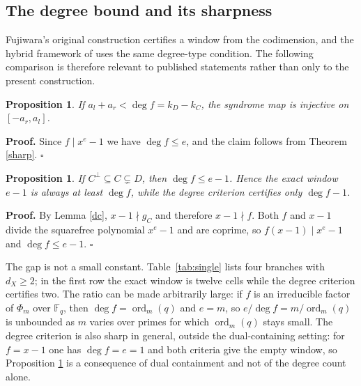 \documentclass[11pt,reqno]{amsart}
\newtheorem{proposition}[theorem]{Proposition}
\theoremstyle{definition}
\theoremstyle{remark}
\newcommand{\F}{\mathbb{F}}
\newcommand{\ord}{\operatorname{ord}}
\begin{document}
\subsection{The degree bound and its sharpness}

Fujiwara's original construction certifies a window from the codimension, and the hybrid framework of \cite{TansuwannontNemec2026} uses the same degree-type condition. The following comparison is therefore relevant to published statements rather than only to the present construction.


\begin{proposition}\label{degree}
If $a_l+a_r<\deg f=k_D-k_C$, the syndrome map is injective on $[-a_r,a_l]$.
\end{proposition}

\textbf{Proof.} Since $f\mid x^e-1$ we have $\deg f\le e$, and the claim follows from Theorem \ref{sharp}. $\square$


\begin{proposition}\label{gap}
If $C^\perp\subseteq C\subsetneq D$, then $\deg f\le e-1$. Hence the exact window $e-1$ is always at least $\deg f$, while the degree criterion certifies only $\deg f-1$.
\end{proposition}

\textbf{Proof.} By Lemma \ref{dc}, $x-1\nmid g_C$ and therefore $x-1\nmid f$. Both $f$ and $x-1$ divide the squarefree polynomial $x^e-1$ and are coprime, so $f(x-1)\mid x^e-1$ and $\deg f\le e-1$. $\square$


The gap is not a small constant. Table~\ref{tab:single} lists four branches with $d_X\ge2$; in the first row the exact window is twelve cells while the degree criterion certifies two. The ratio can be made arbitrarily large: if $f$ is an irreducible factor of $\Phi_m$ over $\F_q$, then $\deg f=\ord_m(q)$ and $e=m$, so $e/\deg f=m/\ord_m(q)$ is unbounded as $m$ varies over primes for which $\ord_m(q)$ stays small. The degree criterion is also sharp in general, outside the dual-containing setting: for $f=x-1$ one has $\deg f=e=1$ and both criteria give the empty window, so Proposition \ref{gap} is a consequence of dual containment and not of the degree count alone.
\end{document}
